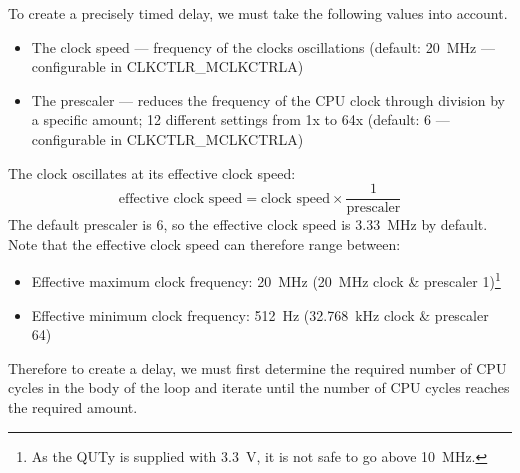 \documentclass{report}
\begin{document}
To create a precisely timed delay, we must take the following values into account.
\begin{itemize}
    \item The clock speed --- frequency of the clocks oscillations (default: \qty{20}{MHz} --- configurable in CLKCTLR\_MCLKCTRLA)
    \item The prescaler --- reduces the frequency of the CPU clock through division by a specific amount; 12 different settings from 1x to 64x (default: 6 --- configurable in CLKCTLR\_MCLKCTRLA)
\end{itemize}
The clock oscillates at its effective clock speed:
\begin{equation*}
    \text{effective clock speed} = \text{clock speed} \times \frac{1}{\text{prescaler}}
\end{equation*}
The default prescaler is 6, so the effective clock speed is \qty{3.33}{MHz} by default.
Note that the effective clock speed can therefore range between:
\begin{itemize}
    \item Effective maximum clock frequency: \qty{20}{MHz} (\qty{20}{MHz} clock \& prescaler 1)\footnote{As the QUTy is supplied with \qty{3.3}{V}, it is not safe to go above \qty{10}{MHz}.}
    \item Effective minimum clock frequency: \qty{512}{Hz} (\qty{32.768}{kHz} clock \& prescaler 64)
\end{itemize}
Therefore to create a delay, we must first determine the required number of CPU cycles in the body of the loop
and iterate until the number of CPU cycles reaches the required amount.
\end{document}
